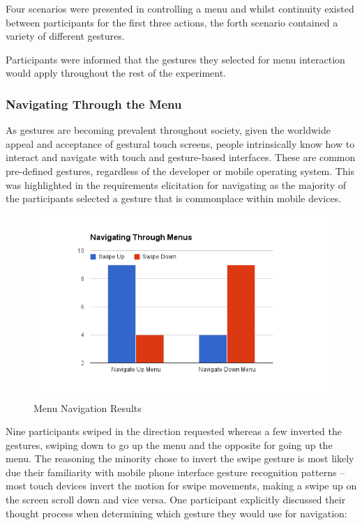 \documentclass{l4proj}
\begin{document}
Four scenarios were presented in controlling a menu and whilst continuity existed between participants for the first three actions, the forth scenario contained a variety of different gestures.

Participants were informed that the gestures they selected for menu interaction would apply throughout the rest of the experiment.

\subsubsection{Navigating Through the Menu}
\vspace{-3mm}
As gestures are becoming prevalent throughout society, given the worldwide appeal and acceptance of gestural touch screens, people intrinsically know how to interact and navigate with touch and gesture-based interfaces. These are common pre-defined gestures, regardless of the developer or mobile operating system. This was highlighted in the requirements elicitation for navigating as the majority of the participants selected a gesture that is commonplace within mobile devices.

\begin{figure}[h!]
\centering
\includegraphics[width=6in]{images/Navigate_Menu.png}
\caption{Menu Navigation Results}
\label{fig:sawb}
\end{figure}
\newpage

Nine participants swiped in the direction requested whereas a few inverted the gestures, swiping down to go up the menu and the opposite for going up the menu. The reasoning the minority chose to invert the swipe gesture is most likely due their familiarity with mobile phone interface gesture recognition patterns – most touch devices invert the motion for swipe movements, making a swipe up on the screen scroll down and vice versa. One participant explicitly discussed their thought process when determining which gesture they would use for navigation:
\end{document}
